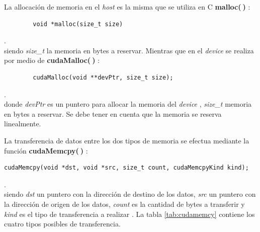 La allocación de memoria en el \textit{host} es la misma que se utiliza en \textsc{C}  \textbf{malloc($\>$)} :
{\footnotesize
	\begin{frame}{}
		\begin{lstlisting}
		void *malloc(size_t size)
		\end{lstlisting}
		
	\end{frame}
}.
\\
siendo \textit{size\_t} la memoria en bytes a reservar. Mientras que en el \textit{device} se realiza por medio de \textbf{cudaMalloc($\>$)} :
\\
{\footnotesize
\begin{frame}{}
	\begin{lstlisting}
		cudaMalloc(void **devPtr, size_t size);
	\end{lstlisting}

\end{frame}
}.
\\
donde \textit{devPtr} es un puntero para allocar la memoria del \textit{device} , \textit{size\_t} memoria en bytes a reservar. Se debe tener en cuenta que la memoria se reserva linealmente.

La transferencia de datos entre los dos tipos de memoria se efectua mediante la función \textbf{cudaMemcpy($\>$)} :
{\footnotesize
\begin{frame}{}
	\begin{lstlisting}
cudaMemcpy(void *dst, void *src, size_t count, cudaMemcpyKind kind);
	\end{lstlisting}
	
\end{frame}
}.
\\
siendo \textit{dst} un puntero con la dirección de destino de los datos, \textit{src} un puntero con la dirección de origen de los datos, \textit{count} es la cantidad de bytes a transferir y \textit{kind} es el tipo de transferencia a realizar \cite{zone2020cuda}. La tabla \ref{tab:cudamemcy} contiene los cuatro tipos posibles de transferencia.


